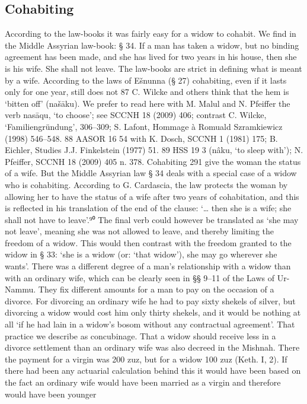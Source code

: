 \documentclass[11pt]{article}
\begin{document}
\subsection{Cohabiting}
According to the law-books it was fairly easy for a widow to cohabit. We find in
the Middle Assyrian law-book:
§ 34. If a man has taken a widow, but no binding agreement has been made, and she has
lived for two years in his house, then she is his wife. She shall not leave.
The law-books are strict in defining what is meant by a wife. According to the
laws of Ešnunna (§ 27) cohabiting, even if it lasts only for one year, still does not
87 C. Wilcke and others think that the hem is ‘bitten off’ (našāku). We prefer to read here with
M. Malul and N. Pfeiffer the verb nasāqu, ‘to choose’; see SCCNH 18 (2009) 406; contrast C. Wilcke, ‘Familiengründung’, 306–309; S. Lafont, Hommage à Romuald Szramkiewicz (1998) 546–548.
88 AASOR 16 54 with K. Dosch, SCCNH 1 (1981) 175; B. Eichler, Studies J.J. Finkelstein (1977) 51.
89 HSS 19 3 (nâku, ‘to sleep with’); N. Pfeiffer, SCCNH 18 (2009) 405 n. 378.
Cohabiting 291
give the woman the status of a wife. But the Middle Assyrian law § 34 deals with
a special case of a widow who is cohabiting. According to G. Cardascia, the law
protects the woman by allowing her to have the status of a wife after two years
of cohabitation, and this is reflected in his translation of the end of the clause:
‘… then she is a wife; she shall not have to leave’.⁹⁰ The final verb could however
be translated as ‘she may not leave’, meaning she was not allowed to leave,
and thereby limiting the freedom of a widow. This would then contrast with the
freedom granted to the widow in § 33: ‘she is a widow (or: ‘that widow’), she may
go wherever she wants’.
There was a different degree of a man’s relationship with a widow than with
an ordinary wife, which can be clearly seen in §§ 9–11 of the Laws of Ur-Nammu.
They fix different amounts for a man to pay on the occasion of a divorce. For
divorcing an ordinary wife he had to pay sixty shekels of silver, but divorcing a
widow would cost him only thirty shekels, and it would be nothing at all ‘if he
had lain in a widow’s bosom without any contractual agreement’. That practice
we describe as concubinage. That a widow should receive less in a divorce settlement than an ordinary wife was also decreed in the Mishnah. There the payment
for a virgin was 200 zuz, but for a widow 100 zuz (Keth. I, 2). If there had been any
actuarial calculation behind this it would have been based on the fact an ordinary
wife would have been married as a virgin and therefore would have been younger
\end{document}
